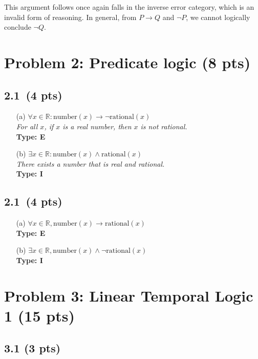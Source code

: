 \documentclass[12pt]{article}
\begin{document}
This argument follows once again falls in the inverse error category, which is an invalid form of reasoning. In general, from $P \rightarrow Q$ and $\neg P$, we cannot logically conclude $\neg Q$.


\newpage
\section*{Problem 2: Predicate logic (8 pts)}

\subsection*{2.1 \,(4 pts)}
\begin{enumerate}
    \item[(a)] $\forall x \in \mathbb{R} : \text{number}(x) \rightarrow \neg \text{rational}(x)$ \\
    \textit{For all $x$, if $x$ is a real number, then $x$ is not rational.} \\
    \textbf{Type: E}
    \item[(b)] $\exists x \in \mathbb{R} : \text{number}(x) \land \text{rational}(x)$ \\
    \textit{There exists a number that is real and rational.} \\
    \textbf{Type: I}
\end{enumerate}

\subsection*{2.1 \,(4 pts)}

\begin{enumerate}
    \item[(a)] $\forall x \in \mathbb{R}, \text{number}(x) \rightarrow \text{rational}(x)$ \\
    \textbf{Type: E}
    \item[(b)] $\exists x \in \mathbb{R}, \text{number}(x) \wedge \neg \text{rational}(x)$ \\
    \textbf{Type: I}
\end{enumerate}
\newpage

\section*{Problem 3: Linear Temporal Logic 1 (15 pts)}

\subsection*{3.1 (3 pts)}
\end{document}
